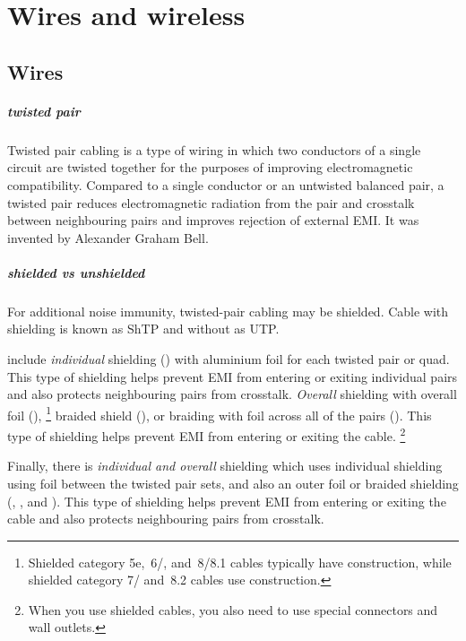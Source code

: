 \chapter{Wires and wireless}
\label{chap:wires-wireless}

\section{Wires}
\label{sec:wires}

\paragraph{twisted pair}
Twisted pair cabling is a type of wiring in which two conductors of a single circuit are twisted together for the purposes of improving electromagnetic compatibility.
Compared to a single conductor or an untwisted balanced pair, a twisted pair reduces electromagnetic radiation from the pair and crosstalk between neighbouring pairs and improves rejection of external \ac{EMI}.
It was invented by Alexander Graham Bell.

\paragraph{shielded vs unshielded}
For additional noise immunity, twisted-pair cabling may be shielded.
Cable with shielding is known as \ac{ShTP} and without as \ac{UTP}.
   

 include \emph{individual} shielding () with aluminium foil for each twisted pair or quad.
This type of shielding helps prevent \ac{EMI} from entering or exiting individual pairs and also protects neighbouring pairs from crosstalk.
\emph{Overall} shielding with overall foil (),%
   \footnote{%
   Shielded category 5e,~6/, and~8/8.1 cables typically have  construction, while shielded category 7/ and~8.2 cables use  construction.
   }
braided shield (), or braiding with foil across all of the pairs ().
This type of shielding helps prevent \ac{EMI} from entering or exiting the cable.%
   \footnote{When you use shielded cables, you also need to use special connectors and wall outlets.}

Finally, there is \emph{individual and overall} shielding which uses individual shielding using foil between the twisted pair sets, and also an outer foil or braided shielding (, , and ).
This type of shielding helps prevent \ac{EMI} from entering or exiting the cable and also protects neighbouring pairs from crosstalk.


